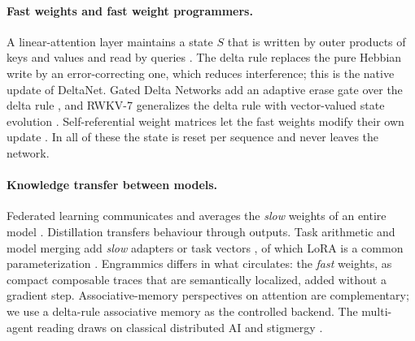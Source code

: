 \documentclass[11pt]{article}
\theoremstyle{definition}
\begin{document}
\paragraph{Fast weights and fast weight programmers.}
A linear-attention layer maintains a state $S$ that is written by outer products of keys and values and read by queries \cite{schlag2021,ba2016}. The delta rule \cite{schlag2021} replaces the pure Hebbian write by an error-correcting one, which reduces interference; this is the native update of DeltaNet. Gated Delta Networks add an adaptive erase gate over the delta rule \cite{yang2024gdn}, and RWKV-7 generalizes the delta rule with vector-valued state evolution \cite{peng2025rwkv7}. Self-referential weight matrices let the fast weights modify their own update \cite{irie2022}. In all of these the state is reset per sequence and never leaves the network.

\paragraph{Knowledge transfer between models.}
Federated learning communicates and averages the \emph{slow} weights of an entire model \cite{mcmahan2017}. Distillation transfers behaviour through outputs. Task arithmetic and model merging add \emph{slow} adapters or task vectors \cite{ilharco2023}, of which LoRA is a common parameterization \cite{hu2021}. Engrammics differs in what circulates: the \emph{fast} weights, as compact composable traces that are semantically localized, added without a gradient step. Associative-memory perspectives on attention \cite{ramsauer2021} are complementary; we use a delta-rule associative memory as the controlled backend. The multi-agent reading draws on classical distributed AI \cite{ferber1999} and stigmergy \cite{grasse1959}.
\end{document}
